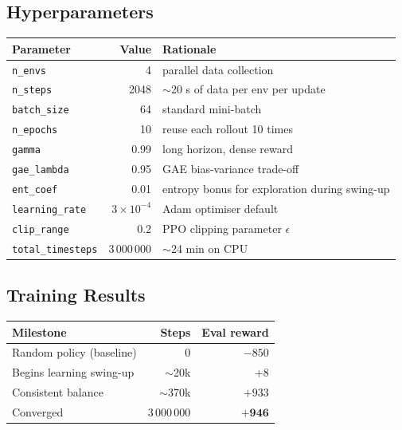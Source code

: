 \documentclass[12pt,a4paper]{article}
\begin{document}
\subsection{Hyperparameters}

\begin{center}
\begin{tabular}{lrl}
\toprule
\textbf{Parameter} & \textbf{Value} & \textbf{Rationale} \\
\midrule
\texttt{n\_envs}        & 4                   & parallel data collection \\
\texttt{n\_steps}       & 2048                & $\sim$20 s of data per env per update \\
\texttt{batch\_size}    & 64                  & standard mini-batch \\
\texttt{n\_epochs}      & 10                  & reuse each rollout 10 times \\
\texttt{gamma}          & 0.99                & long horizon, dense reward \\
\texttt{gae\_lambda}    & 0.95                & GAE bias-variance trade-off \\
\texttt{ent\_coef}      & 0.01                & entropy bonus for exploration during swing-up \\
\texttt{learning\_rate} & $3\times10^{-4}$    & Adam optimiser default \\
\texttt{clip\_range}    & 0.2                 & PPO clipping parameter $\epsilon$ \\
\texttt{total\_timesteps} & 3\,000\,000       & $\sim$24 min on CPU \\
\bottomrule
\end{tabular}
\end{center}

\subsection{Training Results}

\begin{center}
\begin{tabular}{lrr}
\toprule
\textbf{Milestone} & \textbf{Steps} & \textbf{Eval reward} \\
\midrule
Random policy (baseline)  & 0            & $-850$ \\
Begins learning swing-up  & $\sim$20k    & $+8$   \\
Consistent balance        & $\sim$370k   & $+933$ \\
Converged                 & 3\,000\,000  & $\mathbf{+946}$ \\
\bottomrule
\end{tabular}
\end{center}
\end{document}
